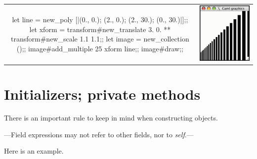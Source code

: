\begin{center}
\begin{tabular}{cc}
\begin{minipage}[b]{3.5in}
\begin{ocamllisting}
let line =
   new_poly [|(0., 0.); (2., 0.); (2., 30.); (0., 30.)|];;
let xform =
   transform#new_translate 3. 0. ** transform#new_scale 1.1 1.1;;
let image = new_collection ();;
image#add_multiple 25 xform line;;
image#draw;;
\end{ocamllisting}
\end{minipage}
&
\includegraphics[scale=0.3]{graphics8}
\end{tabular}
\end{center}

\section{Initializers; private methods}

There is an important rule to keep in mind when constructing objects.

\begin{center}
---Field expressions may not refer to other fields, nor to \emph{self}.---
\end{center}
%
Here is an example.

